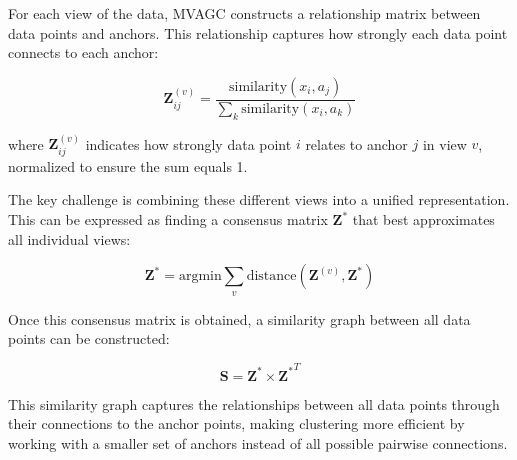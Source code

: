 For each view of the data, MVAGC constructs a relationship matrix between data points and anchors. This relationship captures how strongly each data point connects to each anchor:

\begin{equation}
\mathbf{Z}_{ij}^{(v)} = \frac{\text{similarity}(x_i, a_j)}{\sum_k \text{similarity}(x_i, a_k)}
\end{equation}

where $\mathbf{Z}_{ij}^{(v)}$ indicates how strongly data point $i$ relates to anchor $j$ in view $v$, normalized to ensure the sum equals 1.

The key challenge is combining these different views into a unified representation. This can be expressed as finding a consensus matrix $\mathbf{Z}^*$ that best approximates all individual views:

\begin{equation}
\mathbf{Z}^* = \text{argmin} \sum_{v} \text{distance}(\mathbf{Z}^{(v)}, \mathbf{Z}^*)
\end{equation}

Once this consensus matrix is obtained, a similarity graph between all data points can be constructed:

\begin{equation}
\mathbf{S} = \mathbf{Z}^* \times {\mathbf{Z}^*}^T
\end{equation}

This similarity graph captures the relationships between all data points through their connections to the anchor points, making clustering more efficient by working with a smaller set of anchors instead of all possible pairwise connections.

